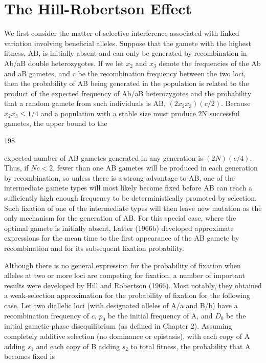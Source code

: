 \documentclass{article}
\begin{document}
\section{The Hill-Robertson Effect}
We first consider the matter of selective interference associated with linked variation involving beneficial alleles. Suppose that the gamete with the highest fitness, AB, is initially absent and can only be generated by recombination in Ab/aB double heterozygotes. If we let  $ x_2 $ and  $ x_3 $ denote the frequencies of the Ab and aB gametes, and c be the recombination frequency between the two loci, then the probability of AB being generated in the population is related to the product of the expected frequency of Ab/aB heterozygotes and the probability that a random gamete from such individuals is AB,  $ (2x_2x_3)(c/2) $. Because  $ x_2x_3 \leq 1/4 $ and a population with a stable size must produce 2N successful gametes, the upper bound to the

198

expected number of AB gametes generated in any generation is  $ (2N)(c/4) $. Thus, if  $ Nc < 2 $, fewer than one AB gametes will be produced in each generation by recombination, so unless there is a strong advantage to AB, one of the intermediate gamete types will most likely become fixed before AB can reach a sufficiently high enough frequency to be deterministically promoted by selection. Such fixation of one of the intermediate types will then leave new mutation as the only mechanism for the generation of AB. For this special case, where the optimal gamete is initially absent, Latter (1966b) developed approximate expressions for the mean time to the first appearance of the AB gamete by recombination and for its subsequent fixation probability.

Although there is no general expression for the probability of fixation when alleles at two or more loci are competing for fixation, a number of important results were developed by Hill and Robertson (1966). Most notably, they obtained a weak-selection approximation for the probability of fixation for the following case. Let two diallelic loci (with designated alleles of A/a and B/b) have a recombination frequency of  $ c $,  $ p_0 $ be the initial frequency of A, and  $ D_0 $ be the initial gametic-phase disequilibrium (as defined in Chapter 2). Assuming completely additive selection (no dominance or epistasis), with each copy of A adding  $ s_1 $ and each copy of B adding  $ s_2 $ to total fitness, the probability that A becomes fixed is
\end{document}
